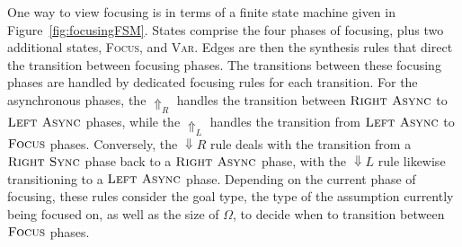 One way to view focusing is in terms of a finite state machine given in
Figure~\ref{fig:focusingFSM}. States comprise the four phases of focusing, plus
two additional states, \textsc{Focus}, and \textsc{Var}. Edges are then the
synthesis rules that direct the transition between focusing phases. The
transitions between these focusing phases are handled by dedicated focusing
rules for each transition. For the asynchronous phases, the $\Uparrow_{R}$
handles the transition between $\textsc{Right Async}$ to $\textsc{Left Async}$
phases, while the $\Uparrow_{L}$ handles the transition from $\textsc{Left
Async}$ to $\textsc{Focus}$ phases. Conversely, the $\Downarrow{R}$ rule deals
with the transition from a $\textsc{Right Sync}$ phase back to a $\textsc{Right
Async}$ phase, with the $\Downarrow{L}$ rule likewise transitioning to a
$\textsc{Left Async}$ phase. Depending on the current phase of focusing, these
rules consider the goal type, the type of the assumption currently being focused
on, as well as the size of $\Omega$, to decide when to transition between
$\textsc{Focus}$ phases.  


